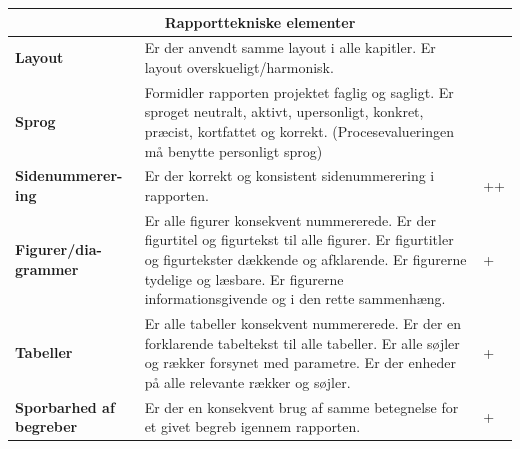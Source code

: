 \begin{longtable}{|p{30mm}|p{90mm}|p{25mm}|}
\hline
\multicolumn{3}{|c|}{\textbf{Rapporttekniske elementer}} \\ \hline

\textbf{Layout} & Er der anvendt samme layout i alle kapitler. 
Er layout overskueligt/harmonisk.
                                        &           \\ \hline

\textbf{Sprog} & Formidler rapporten projektet faglig og sagligt.
Er sproget  neutralt, aktivt, upersonligt, konkret, præcist, kortfattet og korrekt.
(Procesevalueringen må benytte personligt sprog)
                                        &           \\ \hline

\textbf{Sidenummerer-ing} & Er der korrekt og konsistent sidenummerering i rapporten. 
                                        &   ++ \\ \hline

\textbf{Figurer/dia-grammer} & Er alle figurer konsekvent nummererede.
Er der figurtitel og figurtekst til alle figurer.
Er figurtitler og figurtekster dækkende og afklarende.
Er figurerne tydelige og læsbare.
Er figurerne informationsgivende og i den rette sammenhæng.
                                        &    +       \\ \hline

\textbf{Tabeller} & Er alle tabeller konsekvent nummererede.
Er der en forklarende tabeltekst til alle tabeller.
Er alle søjler og rækker forsynet med parametre.
Er der enheder på alle relevante rækker og søjler.
                                        &    +       \\ \hline

\textbf{Sporbarhed af begreber} & Er der en konsekvent brug af samme betegnelse for et givet begreb igennem rapporten. 
                                        &      +     \\ \hline



\end{longtable}

